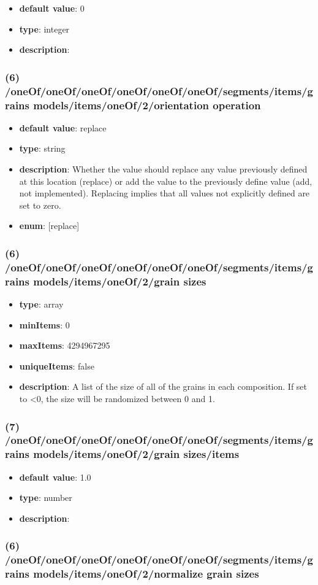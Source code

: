 \begin{itemize}[leftmargin=7em]\item {\bf default value}: 0
\item {\bf type}: integer
\item {\bf description}: 
\end{itemize}\subsubsection{(6) /oneOf/oneOf/oneOf/oneOf/oneOf/oneOf/segments/items/grains models/items/oneOf/2/orientation operation}
\begin{itemize}[leftmargin=6em]\item {\bf default value}: replace
\item {\bf type}: string
\item {\bf description}: Whether the value should replace any value previously defined at this location (replace) or add the value to the previously define value (add, not implemented). Replacing implies that all values not explicitly defined are set to zero.
\item {\bf enum}: [replace]\end{itemize}\subsubsection{(6) /oneOf/oneOf/oneOf/oneOf/oneOf/oneOf/segments/items/grains models/items/oneOf/2/grain sizes}
\begin{itemize}[leftmargin=6em]\item {\bf type}: array
\item {\bf minItems}: 0
\item {\bf maxItems}: 4294967295
\item {\bf uniqueItems}: false
\item {\bf description}: A list of the size of all of the grains in each composition. If set to <0, the size will be randomized between 0 and 1.
\end{itemize}\subsubsection{(7) /oneOf/oneOf/oneOf/oneOf/oneOf/oneOf/segments/items/grains models/items/oneOf/2/grain sizes/items}
\begin{itemize}[leftmargin=7em]\item {\bf default value}: 1.0
\item {\bf type}: number
\item {\bf description}: 
\end{itemize}\subsubsection{(6) /oneOf/oneOf/oneOf/oneOf/oneOf/oneOf/segments/items/grains models/items/oneOf/2/normalize grain sizes}
